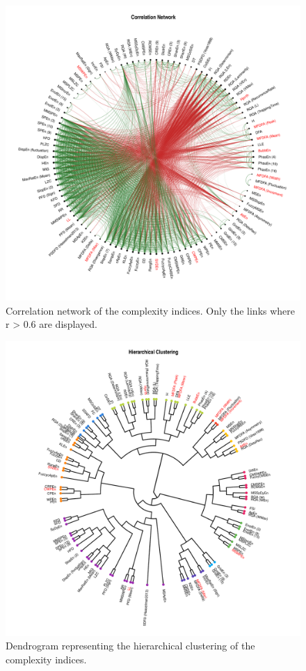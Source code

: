 \documentclass[
  man]{apa6}
\begin{document}
\begin{figure}
\centering
\includegraphics{./figures/ggm-1.pdf}
\caption{\label{fig:ggm}Correlation network of the complexity indices. Only the links where \textbar r\textbar{} \textgreater{} 0.6 are displayed.}
\end{figure}

\begin{figure}
\centering
\includegraphics{./figures/clustering-1.pdf}
\caption{\label{fig:clustering}Dendrogram representing the hierarchical clustering of the complexity indices.}
\end{figure}
\end{document}
